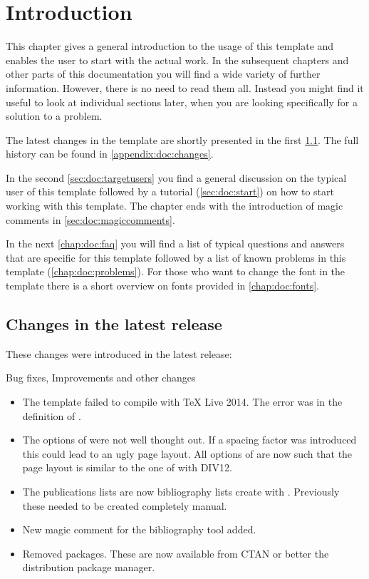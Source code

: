 \chapter{Introduction}

This chapter gives a general introduction to the usage of this template and enables the user to start with the actual work. 
In the subsequent chapters and other parts of this documentation you will find a wide variety of further information. However, there is no need to read them all. Instead you might find it useful to look at individual sections later, when you are looking specifically for a solution to a problem.

The latest changes in the template are shortly presented in the first \cref{sec:doc:changes}. The full history can be found in \cref{appendix:doc:changes}.

In the second \cref{sec:doc:targetusers} you find a general discussion on the typical user of this template followed by a tutorial (\cref{sec:doc:start}) on how to start working with this template. The chapter ends with the introduction of magic comments in \cref{sec:doc:magiccomments}.

In the next \cref{chap:doc:faq} you will find a list of typical questions and answers that are specific for this template followed by a list of known problems in this template (\cref{chap:doc:problems}). For those who want to change the font in the template there is a short overview on fonts provided in \cref{chap:doc:fonts}.
\section{Changes in the latest release}
\label{sec:doc:changes}

These changes were introduced in the latest release:

Bug fixes, Improvements and other changes
\begin{itemize}
\item The template failed to compile with TeX Live 2014. The error was in the definition of . 
\item The options of  were not well thought out. If a spacing factor was introduced this could lead to an ugly page layout. All options of  are now such that the page layout is similar to the one of  with DIV12. 
\item The publications lists are now bibliography lists create with . Previously these needed to be created completely manual.
\item New magic comment for the bibliography tool added.
\item Removed packages. These are now available from CTAN or better the distribution package manager. 
\end{itemize}

